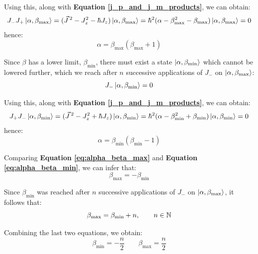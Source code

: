 Using this, along with \textbf{Equation \ref{j_p_and_j_m_products}}, we can obtain:
\begin{equation}
    J_-J_+\ket{\alpha,\beta_\text{max}} = (\vec{J}\,^2 - J_z^2 - \hbar J_z)\ket{\alpha,\beta_\text{max}} = \hbar^2(\alpha-\beta_\text{max}^2 - \beta_\text{max})\ket{\alpha,\beta_\text{max}} = 0
\end{equation}
hence:
\begin{equation}
    \alpha = \beta_\text{max}(\beta_\text{max} + 1)
\end{equation}

Since $\beta$ has a lower limit, $\beta_\text{min}$, there must exist a state $\ket{\alpha, \beta_\text{min}}$ which cannot be lowered further, which we reach after $n$ successive applications of $J_-$ on $\ket{\alpha, \beta_\text{max}}$:
\begin{equation} \label{eq:alpha_beta_max}
    J_-\ket{\alpha, \beta_\text{min}} = 0
\end{equation}

Using this, along with \textbf{Equation \ref{j_p_and_j_m_products}}, we can obtain:
\begin{equation}
    J_+J_-\ket{\alpha,\beta_\text{min}} = (\vec{J}\,^2 - J_z^2 + \hbar J_z)\ket{\alpha,\beta_\text{min}} = \hbar^2(\alpha-\beta_\text{min}^2 + \beta_\text{min})\ket{\alpha,\beta_\text{min}} = 0
\end{equation}
hence:
\begin{equation} \label{eq:alpha_beta_min}
    \alpha = \beta_\text{min}(\beta_\text{min} - 1)
\end{equation}

Comparing \textbf{Equation \ref{eq:alpha_beta_max}} and \textbf{Equation \ref{eq:alpha_beta_min}}, we can infer that:
\begin{equation}
    \beta_\text{max} = -\beta_\text{min}
\end{equation}

Since $\beta_\text{min}$ was reached after $n$ successive applications of $J_-$ on $\ket{\alpha, \beta_\text{max}}$, it follows that:
\begin{equation}
    \beta_\text{max} = \beta_\text{min} + n, \qquad n\in \mathbb{N}
\end{equation}

Combining the last two equations, we obtain:
\begin{equation}
    \beta_\text{min} = -\frac{n}{2}\qquad \beta_\text{max} = \frac{n}{2}
\end{equation}


